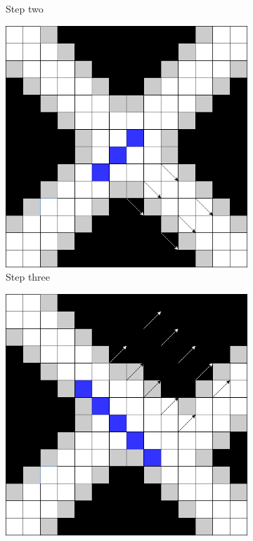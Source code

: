 \documentclass[../Head/Main.tex]{subfiles}
\begin{document}
\begin{figure}[H]
\begin{subfigure}{.24\textwidth}
        \caption{Step two}
        \label{fig:peak_search_step2}
    \end{subfigure}
    \hfill
    \begin{subfigure}{.24\textwidth}
        \centering
        \includegraphics[width=\textwidth]{../Figures/screening_algorithm/peak_search_step3.png}
        \caption{Step three}
        \label{fig:peak_search_step3}
    \end{subfigure}
    \hfill
    \begin{subfigure}{.24\textwidth}
        \centering
        \includegraphics[width=\textwidth]{../Figures/screening_algorithm/peak_search_step4.png}

\end{subfigure}
\end{figure}
\end{document}
